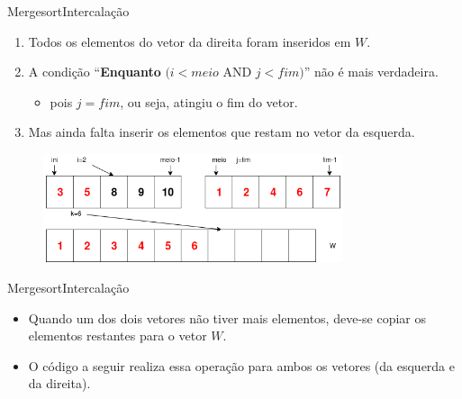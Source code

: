 \documentclass[aspectratio=169]{beamer}
\begin{document}
\begin{frame}{Mergesort}{Intercalação}
\begin{enumerate}
 \item Todos os elementos do vetor da direita foram inseridos em $W$.
 \item A condição ``{\bf Enquanto }$(i<meio$ AND $j<fim)$'' não é mais verdadeira.
 \begin{itemize}
 \item pois $j=fim$, ou seja, atingiu o fim do vetor.
 \end{itemize}
 \item Mas ainda falta inserir os elementos que restam no vetor da esquerda.
\end{enumerate}

\begin{figure}[!h]
  \centering
  \includegraphics[width=250pt]{imgs/merge/merge8.png}
  \label{fig_merge8}
\end{figure}
\end{frame}


\begin{frame}{Mergesort}{Intercalação}
\begin{itemize}
\item Quando um dos dois vetores não tiver mais elementos, deve-se copiar os elementos restantes para o vetor $W$. 
\item O código a seguir realiza essa operação para ambos os vetores (da esquerda e da direita).
\end{itemize}
\begin{algorithm}[H]
\end{algorithm}
\end{frame}
\end{document}
